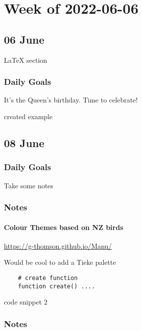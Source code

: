 \documentclass[weekly_log.tex]{subfiles}
\begin{document}
\chapter{Week of 2022-06-06}






\section{06 June}
\LaTeX{} section


\subsection{Daily Goals}
\begin{todolist}
    \item[\done] It's the Queen's birthday. Time to celebrate!
    \item[\done] created example 
\end{todolist}




\section{08 June}

\subsection{Daily Goals}
\begin{todolist}
    \item[\done] Take some notes
\end{todolist}

\subsection{Notes}
\subsubsection{Colour Themes based on NZ birds}
\url{https://g-thomson.github.io/Manu/}

Would be cool to add a Tieke palette



\begin{verbatim}
    # create function 
    function create() ....
\end{verbatim}

code snippet 2

  
  


\subsection{Notes}

\bib{}
\end{document}
